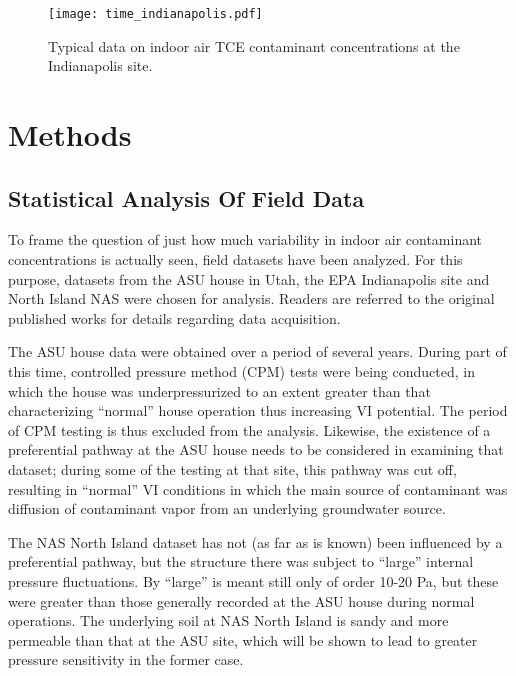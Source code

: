 \documentclass[journal=esthag,manuscript=article]{achemso}
\begin{document}
\begin{figure}
 \caption{Typical data on indoor air TCE contaminant concentrations at the Indianapolis site\cite{u.s._environmental_protection_agency_assessment_2015}.}\label{fig:indianapolis}
 \texttt{[image: time\_indianapolis.pdf]}
\end{figure}

\section{Methods}


\subsection{Statistical Analysis Of Field Data}

To frame the question of just how much variability in indoor air contaminant concentrations is actually seen, field datasets have been analyzed.
For this purpose, datasets from the ASU house in Utah, the EPA Indianapolis site and North Island NAS were chosen for analysis.
Readers are referred to the original published works for details regarding data acquisition\cite{holton_evaluation_2015,guo_vapor_2015,holton_temporal_2013,hosangadi_high-frequency_2017,u.s._environmental_protection_agency_assessment_2015}.

The ASU house data were obtained over a period of several years.
During part of this time, controlled pressure method (CPM) tests were being conducted, in which the house was underpressurized to an extent greater than that characterizing “normal” house operation thus increasing VI potential\cite{mchugh_evaluation_2012,mchugh_recent_2017,holton_evaluation_2015}.
The period of CPM testing is thus excluded from the analysis.
Likewise, the existence of a preferential pathway at the ASU house needs to be considered in examining that dataset; during some of the testing at that site, this pathway was cut off, resulting in “normal” VI conditions in which the main source of contaminant was diffusion of contaminant vapor from an underlying groundwater source.

The NAS North Island dataset has not (as far as is known) been influenced by a preferential pathway, but the structure there was subject to “large” internal pressure fluctuations.
By “large” is meant still only of order 10-20 Pa, but these were greater than those generally recorded at the ASU house during normal operations.
The underlying soil at NAS North Island is sandy\cite{hosangadi_high-frequency_2017} and more permeable than that at the ASU site, which will be shown to lead to greater pressure sensitivity in the former case.
\end{document}
